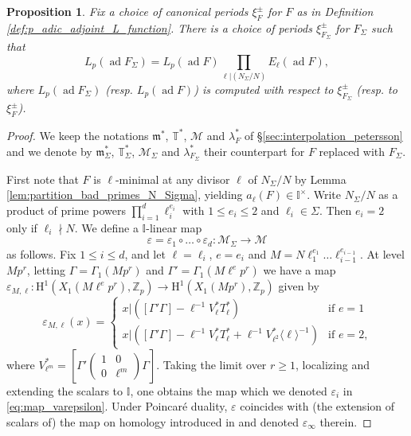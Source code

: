 \documentclass[12pt]{amsart}
\newcommand\bI{\mathbb{I}}
\newcommand\bT{\mathbb{T}}
\newcommand\Zp{{\mathbb{Z}_p}}
\newcommand\cM{\mathcal{M}}
\newcommand\gm{\mathfrak{m}}
\DeclareMathOperator{\ad}{ad}
\newcommand{\HH}{\mathrm{H}}
\theoremstyle{defstyle}
\theoremstyle{thmstyle}
\newtheorem{proposition}[subsubsection]{Proposition}
\begin{document}
\begin{proposition}\label{prop:change_of_level_p_adic_L}
	Fix a choice of canonical periods $\xi^\pm_F$ for $F$ as in Definition \ref{def:p_adic_adjoint_L_function}. There is a choice of periods $\xi^\pm_{F_\Sigma}$ for $F_\Sigma$ such that 
	\[L_p(\ad F_\Sigma)=L_p(\ad F)\prod_{\ell|(N_\Sigma/N)}E_\ell(\ad F),\]
	where $L_p(\ad F_\Sigma)$ (resp. $L_p(\ad F)$) is computed with  respect to $\xi^\pm_{F_\Sigma}$ (resp. to $\xi^\pm_{F}$).
\end{proposition}
\begin{proof}
	We keep the notations $\gm^*$, $\bT^*$, $\cM$ and $\lambda^*_{F}$ of \S\ref{sec:interpolation_petersson} and we denote by $\gm^*_\Sigma$, $\bT^*_\Sigma$, $\cM_\Sigma$ and $\lambda^*_{F_\Sigma}$ their counterpart for $F$ replaced with $F_\Sigma$.
	
	First note that $F$ is $\ell$-minimal at any divisor $\ell$ of $N_\Sigma/N$ by Lemma \ref{lem:partition_bad_primes_N_Sigma}, yielding $a_\ell(F)\in\bI^\times$. Write $N_\Sigma/N$ as a product of prime powers $\prod_{i=1}^{d}\ell_i^{e_i}$ with $1\leq e_i \leq 2$ and $\ell_i\in\Sigma$. Then $e_i=2$ only if $\ell_i\nmid N$. We define a $\bI$-linear map 
	\begin{equation}\label{eq:map_varepsilon}
		\varepsilon=\varepsilon_1\circ\ldots\circ\varepsilon_d \colon \cM_\Sigma \to \cM
	\end{equation}
	as follows. Fix $1\leq i \leq d$, and let $\ell=\ell_i$, $e=e_i$ and $M=N \ell_1^{e_1}\ldots \ell_{i-1}^{e_{i-1}}$. At level $Mp^r$, letting $\Gamma=\Gamma_1(Mp^r)$ and $\Gamma'=\Gamma_1(M\ell^e p^r)$ we have a map $\varepsilon_{M,\ell} \colon \HH^1(X_1(M\ell^e p^r),\Zp) \to \HH^1(X_1(Mp^r),\Zp)$ given by 
	\begin{equation*}
		\varepsilon_{M,\ell}(x)= \left\{\begin{array}{ll}
		 x\big|(\left[ \Gamma' \Gamma \right]-\ell^{-1}V_{\ell}^* T_{\ell}^*) & \textrm{if $e=1$} \\
		x\big|(\left[ \Gamma' \Gamma \right]-\ell^{-1} V_{\ell}^* T_{\ell}^*+\ell^{-1} V_{\ell^2}^* \langle \ell \rangle^{-1}) & \textrm{if $e=2$,}
	\end{array}\right.
	\end{equation*}
	where $V_{\ell^m}^*=\left[\Gamma'\begin{pmatrix}1 & 0 \\ 0 & \ell^m\end{pmatrix}\Gamma\right]$. Taking the limit over $r\geq 1$, localizing and extending the scalars to $\bI$, one obtains the map which we denoted $\varepsilon_i$ in \eqref{eq:map_varepsilon}. Under Poincaré duality, $\varepsilon$ coincides with (the extension of scalars of) the map on homology introduced in \cite[\S3.8]{emerton2006variation} and denoted $\varepsilon_\infty$ therein.
	

\end{proof}
\end{document}
